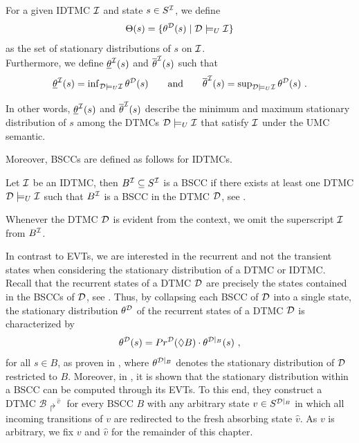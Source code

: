\begin{definition}
    For a given IDTMC $\mathcal{I}$ and state $s\in S^{\mathcal{I}}$, we define 
    \[\Theta(s) = \{\theta^{\mathcal{D}}(s) \mid \mathcal{D} \models_U \mathcal{I}\}\]
    as the set of stationary distributions of $s$ on $\mathcal{I}$. 
    \\Furthermore, we define $\underline{\theta}^{\mathcal{I}}(s)$ and $\overline{\theta}^{\mathcal{I}}(s)$ such that 
    \[\underline{\theta}^{\mathcal{I}}(s) = \operatorname{inf}_{\mathcal{D}\models_U\mathcal{I}}\theta^{\mathcal{D}}(s) \qquad \text{and} \qquad \overline{\theta}^{\mathcal{I}}(s) = \operatorname{sup}_{\mathcal{D}\models_U\mathcal{I}}\theta^{\mathcal{D}}(s)\ .\]  
\end{definition}
In other words, $\underline{\theta}^{\mathcal{I}}(s)$ and $\overline{\theta}^{\mathcal{I}}(s)$ describe the minimum and maximum stationary distribution of $s$ among the DTMCs $\mathcal{D} \models_U \mathcal{I}$ that satisfy $\mathcal{I}$ under the UMC semantic.

Moreover, BSCCs are defined as follows for IDTMCs.
\begin{definition}
    Let $\mathcal{I}$ be an IDTMC, then $B^{\mathcal{I}} \subseteq S^{\mathcal{I}}$ is a BSCC if there exists at least one DTMC $\mathcal{D} \models_U \mathcal{I}$ such that $B^{\mathcal{I}}$ is a BSCC in the DTMC $\mathcal{D}$, see .
\end{definition}
Whenever the DTMC $\mathcal{D}$ is evident from the context, we omit the superscript $\mathcal{I}$ from $B^{\mathcal{I}}$.

In contrast to EVTs, we are interested in the recurrent and not the transient states when considering the stationary distribution of a DTMC or IDTMC. Recall that the recurrent states of a DTMC $\mathcal{D}$ are precisely the states contained in the BSCCs of $\mathcal{D}$, see . Thus, by collapsing each BSCC of $\mathcal{D}$ into a single state, the stationary distribution $\theta^{\mathcal{D}}$ of the recurrent states of a DTMC $\mathcal{D}$ is characterized by 
\begin{equation}\label{eq:Stat_Distr_via_BSCC_for_DTMC} 
    \theta^\MC(s) = Pr^\MC(\lozenge B) \cdot \theta^{\MC|_B}(s)\ ,
\end{equation} 
for all $s\in B$, as proven in \cite{modeling_and_analysis_stochastic_systems}, where $\theta^{\mathcal{D}|_B}$ denotes the stationary distribution of $\mathcal{D}$ restricted to $B$. Moreover, in \cite{Computing_EVTs_Stationary_Distr_in_MCs_Mertens}, it is shown that the stationary distribution within a BSCC can be computed through its EVTs. To this end, they construct a DTMC $\mathcal{B}\!\Rsh^{\hat{v}}$ for every BSCC $B$ with any arbitrary state $v\in S^{\mathcal{D}|_B}$ in which all incoming transitions of $v$ are redirected to the fresh absorbing state $\hat{v}$. As $v$ is arbitrary, we fix $v$ and $\hat{v}$ for the remainder of this chapter.

